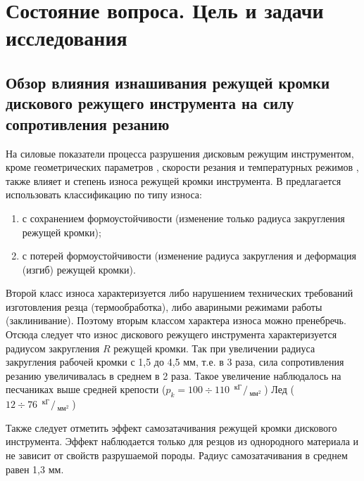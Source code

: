 \chapter{Состояние вопроса. Цель и задачи исследования} \label{chapt1}

\section{Обзор влияния изнашивания режущей кромки дискового режущего инструмента на силу сопротивления резанию} \label{sect1_1}

\def\slantfrac#1#2{ \hspace{3pt}\!^{#1}\!\!\hspace{1pt}/
	\hspace{2pt}\!\!_{#2}\!\hspace{3pt}
} %

На силовые показатели процесса разрушения  дисковым режущим инструментом, кроме геометрических параметров \todo{[Ганжа]}, скорости резания \todo{[Ковалевич]} и температурных режимов \todo{[Каптюк]}, также влияет и степень износа режущей кромки инструмента. В \todo{[Барон]} предлагается использовать классификацию по типу износа:
\begin{enumerate}
	\item с сохранением формоустойчивости (изменение только радиуса закругления режущей кромки);
	\item с потерей формоустойчивости (изменение радиуса закругления и деформация (изгиб) режущей кромки).
\end{enumerate}
Второй класс износа характеризуется либо нарушением технических требований изготовления резца (термообработка), либо авариными режимами работы (заклинивание). Поэтому вторым классом характера износа можно пренебречь. Отсюда следует что износ дискового режущего инструмента характеризуется радиусом закругления $R$ режущей кромки. Так при увеличении радиуса закругления рабочей кромки  с 1,5 до 4,5 мм, т.е. в 3 раза, сила сопротивления резанию увеличивалась в среднем в 2 раза. Такое увеличение наблюдалось на песчаниках выше средней крепости ($p_{k} = 100\div110\ \slantfrac{\text{кГ}}{\text{мм}^{2}}$)
Лед ($12\div76\ \slantfrac{\text{кГ}}{\text{мм}^{2}}$)

Также следует отметить эффект самозатачивания режущей кромки дискового инструмента. Эффект наблюдается только для резцов из однородного материала и не зависит от свойств разрушаемой породы. Радиус самозатачивания в среднем равен 1,3 мм.
